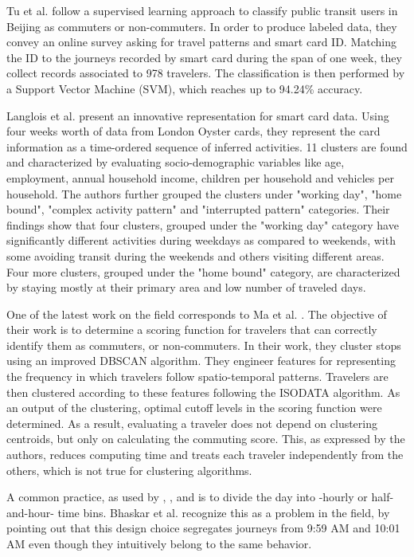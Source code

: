 \documentclass{article}
\begin{document}
Tu et al. \cite{tu2016impact} follow a supervised learning approach to classify public transit users in Beijing as commuters or non-commuters. In order to produce labeled data, they convey an online survey asking for travel patterns and smart card ID. Matching the ID to the journeys recorded by smart card during the span of one week, they collect records associated to 978 travelers. The classification is then performed by a Support Vector Machine (SVM), which reaches up to 94.24\% accuracy.

Langlois et al. \cite{langlois2016inferring} present an innovative representation for smart card data. Using four weeks worth of data from London Oyster cards, they represent the card information as a time-ordered sequence of inferred activities.  11 clusters are found and characterized by evaluating socio-demographic variables like age, employment, annual household income, children per household and vehicles per household. The authors further grouped the clusters under "working day", "home bound", "complex activity pattern" and "interrupted pattern" categories. Their findings show that four clusters, grouped under the "working day" category have significantly different activities during weekdays as compared to weekends, with some avoiding transit during the weekends and others visiting different areas.  Four more clusters, grouped under the "home bound" category, are characterized by staying mostly at their primary area and low number of traveled days. 

One of the latest work on the field corresponds to Ma et al. \cite{ma2017understanding}. The objective of their work is to determine a scoring function for travelers that can correctly identify them as commuters, or non-commuters. In their work, they cluster stops using an improved DBSCAN algorithm. They engineer features for representing the frequency in which travelers follow spatio-temporal patterns. Travelers are then clustered according to these features following the ISODATA algorithm. As an output of the clustering, optimal cutoff levels in the scoring function were determined. As a result, evaluating a traveler does not depend on clustering centroids, but only on calculating the commuting score. This, as expressed by the authors, reduces computing time and treats each traveler independently from the others, which is not true for clustering algorithms.

A common practice, as used by \cite{ma2017understanding}, \cite{langlois2016inferring}, and \cite{morency2007measuring} is to divide the day into -hourly or half-and-hour- time bins. Bhaskar et al.  \cite{bhaskar2015passenger} recognize this as a problem in the field, by pointing out that this design choice segregates journeys from 9:59 AM and 10:01 AM even though they intuitively belong to the same behavior. 
\end{document}

